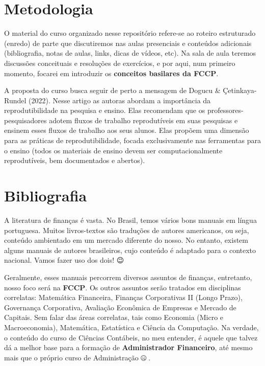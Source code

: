 \documentclass[
  a4paper,
]{book}
\begin{document}
\section*{Metodologia}\label{sec-method}


O material do curso organizado nesse repositório refere-se ao roteiro
estruturado (enredo) de parte que discutiremos nas aulas presenciais e
conteúdos adicionais (bibliografia, notas de aulas, links, dicas de
vídeos, etc). Na sala de aula teremos discussões conceituais e
resoluções de exercícios, e por aqui, num primeiro momento, focarei em
introduzir os \textbf{conceitos basilares da FCCP}.

A proposta do curso busca seguir de perto a mensagem de Dogucu \&
Çetinkaya-Rundel (2022). Nesse artigo as autoras abordam a importância
da reprodutibilidade na pesquisa e ensino. Elas recomendam que os
professores-pesquisadores adotem fluxos de trabalho reprodutíveis em
suas pesquisas e ensinem esses fluxos de trabalho aos seus alunos. Elas
propõem uma dimensão para as práticas de reprodutibilidade, focada
exclusivamente nas ferramentas para o ensino (todos os materiais de
ensino devem ser computacionalmente reprodutíveis, bem documentados e
abertos).

\section*{Bibliografia}\label{sec-biblio}


A literatura de finanças é vasta. No Brasil, temos vários bons manuais
em língua portuguesa. Muitos livros-textos são traduções de autores
americanos, ou seja, conteúdo ambientado em um mercado diferente do
nosso. No entanto, existem alguns manuais de autores brasileiros, cujo
conteúdo é adaptado para o contexto nacional. Vamos fazer uso dos dois!
😉

Geralmente, esses manuais percorrem diversos assuntos de finanças,
entretanto, nosso foco será na \textbf{FCCP}. Os outros assuntos serão
tratados em disciplinas correlatas: Matemática Financeira, Finanças
Corporativas II (Longo Prazo), Governança Corporativa, Avaliação
Econômica de Empresas e Mercado de Capitais. Sem falar das áreas
correlatas, tais como Economia (Micro e Macroeconomia), Matemática,
Estatística e Ciência da Computação. Na verdade, o conteúdo do curso de
Ciências Contábeis, no meu entender, é aquele que talvez dá a melhor
base para a formação de \textbf{Administrador Financeiro}, até mesmo
mais que o próprio curso de Administração 🤐🤫.
\end{document}
